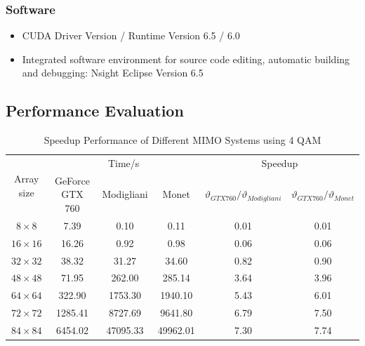 \documentclass[letterpaper, 10pt, conference, twoside]{ieeeconf}
\begin{document}
\subsubsection{Software}
\begin{itemize}
\item CUDA Driver Version / Runtime Version      6.5 / 6.0
\item Integrated software environment for source code editing, automatic building and debugging: Nsight Eclipse Version 6.5
\end{itemize}
\subsection{Performance Evaluation}

\begin{table}[htb]
\centering
\caption{ Speedup Performance of Different MIMO Systems using 4 QAM}
\begin{tabular}{|c|c|c|c|c|c|}
\hline
\multirow{2}{*}{ Array size} & \multicolumn{3}{|c|}{Time/s} & \multicolumn{2}{|c|}{Speedup}\\
\cline{2-6}
&GeForce GTX 760 & Modigliani & Monet &  $\vartheta_{GTX 760}/\vartheta_{Modigliani}$  & $\vartheta_{GTX 760}/\vartheta_{Monet}$ \\
\hline
$8\times 8$& 7.39& 0.10&0.11 & 0.01& 0.01\\
\hline
$16\times 16$&16.26 & 0.92&0.98& 0.06& 0.06\\
\hline
$32\times 32$&38.32 & 31.27& 34.60& 0.82& 0.90\\
\hline
$48\times 48$&71.95& 262.00& 285.14& 3.64& 3.96\\
\hline
$64\times 64$& 322.90&1753.30&1940.10&5.43& 6.01 \\
\hline
$72\times 72 $&1285.41&8727.69 &9641.80 &6.79 &7.50 \\
\hline
$84\times 84$ &6454.02&47095.33&49962.01&7.30&7.74\\
\hline
\end{tabular}
\quad\\[25pt]
\label{speedup1}
\end{table}
\end{document}

